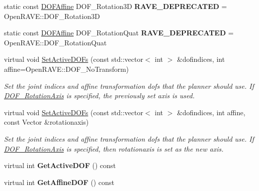 \begin{DoxyCompactItemize}
\item 
\hypertarget{classOpenRAVE_1_1RobotBase_a69f9adfb1b7b3c44f848101a6d3264ec}{
static const \hyperlink{namespaceOpenRAVE_a3016e2185103f3c1bdc5e4482893ca98}{DOFAffine} DOF\_\-Rotation3D {\bfseries RAVE\_\-DEPRECATED} = OpenRAVE::DOF\_\-Rotation3D}
\label{classOpenRAVE_1_1RobotBase_a69f9adfb1b7b3c44f848101a6d3264ec}

\item 
\hypertarget{classOpenRAVE_1_1RobotBase_a9831d84c5bfb91758c158748834737d5}{
static const \hyperlink{namespaceOpenRAVE_a3016e2185103f3c1bdc5e4482893ca98}{DOFAffine} DOF\_\-RotationQuat {\bfseries RAVE\_\-DEPRECATED} = OpenRAVE::DOF\_\-RotationQuat}
\label{classOpenRAVE_1_1RobotBase_a9831d84c5bfb91758c158748834737d5}

\item 
virtual void \hyperlink{classOpenRAVE_1_1RobotBase_a36a3474433e5ec3ab832a28f8fe8651b}{SetActiveDOFs} (const std::vector$<$ int $>$ \&dofindices, int affine=OpenRAVE::DOF\_\-NoTransform)
\begin{DoxyCompactList}\small\item\em Set the joint indices and affine transformation dofs that the planner should use. If \hyperlink{namespaceOpenRAVE_a3016e2185103f3c1bdc5e4482893ca98a5ee6baa8acb92c310cbc1ece082640d0}{DOF\_\-RotationAxis} is specified, the previously set axis is used. \item\end{DoxyCompactList}\item 
virtual void \hyperlink{classOpenRAVE_1_1RobotBase_a1320f8a27bf8e2431f2d876ab74b5375}{SetActiveDOFs} (const std::vector$<$ int $>$ \&dofindices, int affine, const Vector \&rotationaxis)
\begin{DoxyCompactList}\small\item\em Set the joint indices and affine transformation dofs that the planner should use. If \hyperlink{namespaceOpenRAVE_a3016e2185103f3c1bdc5e4482893ca98a5ee6baa8acb92c310cbc1ece082640d0}{DOF\_\-RotationAxis} is specified, then rotationaxis is set as the new axis. \item\end{DoxyCompactList}\item 
\hypertarget{classOpenRAVE_1_1RobotBase_a2fc26db3a3c302bfa1df5d972485e39c}{
virtual int {\bfseries GetActiveDOF} () const }
\label{classOpenRAVE_1_1RobotBase_a2fc26db3a3c302bfa1df5d972485e39c}

\item 
\hypertarget{classOpenRAVE_1_1RobotBase_a84fb801be236fc623a1d0d14de7dd6f9}{
virtual int {\bfseries GetAffineDOF} () const }
\label{classOpenRAVE_1_1RobotBase_a84fb801be236fc623a1d0d14de7dd6f9}


\end{DoxyCompactItemize}
